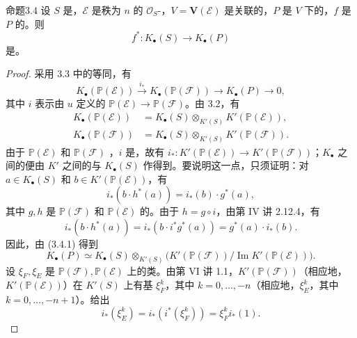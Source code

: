 \begin{SGAresult}{命题}{3.4}
设 $S$ 是，$\mathcal E$ 是秩为 $n$ 的 $\mathcal O_S$-，$V=\mathbf V(\mathcal E)$ 是关联的，$P$ 是 $V$ 下的，$f$ 是 $P$ 的。则
\[
f^*:K_\bullet(S)\longrightarrow K_\bullet(P)
\]
是。
\end{SGAresult}
\begin{proof}
采用 3.3 中的等同，有
\begin{equation}
K_\bullet(\mathbb P(\mathcal E))\xrightarrow{i_*}K_\bullet(\mathbb P(\mathcal F))
\longrightarrow K_\bullet(P)\longrightarrow0,
\tag{3.4.1}
\end{equation}
其中 $i$ 表示由 $u$ 定义的 $\mathbb P(\mathcal E)\to\mathbb P(\mathcal F)$。由 3.2，有
\[
\begin{aligned}
K_\bullet(\mathbb P(\mathcal E))&=K_\bullet(S)\otimes_{K'(S)}K'(\mathbb P(\mathcal E)),\\
K_\bullet(\mathbb P(\mathcal F))&=K_\bullet(S)\otimes_{K'(S)}K'(\mathbb P(\mathcal F)).
\end{aligned}
\]
由于 $\mathbb P(\mathcal E)$ 和 $\mathbb P(\mathcal F)$ ，$i$ 是，故有 $i_*:K'(\mathbb P(\mathcal E))\to K'(\mathbb P(\mathcal F))$；$K_\bullet$ 之间的便由 $K'$ 之间的与 $K_\bullet(S)$ 作得到。要说明这一点，只须证明：对 $a\in K_\bullet(S)$ 和 $b\in K'(\mathbb P(\mathcal E))$，有
\[
i_*(b\cdot h^*(a))=i_*(b)\cdot g^*(a),
\]
其中 $g,h$ 是 $\mathbb P(\mathcal F)$ 和 $\mathbb P(\mathcal E)$ 的。由于 $h=g\circ i$，由第 IV 讲 2.12.4，有
\[
i_*(b\cdot h^*(a))=i_*(b\cdot i^*g^*(a))=g^*(a)\cdot i_*(b).
\]
因此，由 (3.4.1) 得到
\[
K_\bullet(P)\simeq K_\bullet(S)\otimes_{K'(S)}
\bigl(K'(\mathbb P(\mathcal F))/\operatorname{Im}K'(\mathbb P(\mathcal E))\bigr).
\]
设 $\xi_F,\xi_E$ 是 $\mathbb P(\mathcal F),\mathbb P(\mathcal E)$ 上的类。由第 VI 讲 1.1，$K'(\mathbb P(\mathcal F))$（相应地，$K'(\mathbb P(\mathcal E))$）在 $K'(S)$ 上有基 $\xi_F^k$，其中 $k=0,\ldots,-n$（相应地，$\xi_E^k$，其中 $k=0,\ldots,-n+1$）。给出
\[
i_*(\xi_E^k)=i_*(i^*(\xi_F^k))=\xi_F^k i_*(1).
\]
\end{proof}
